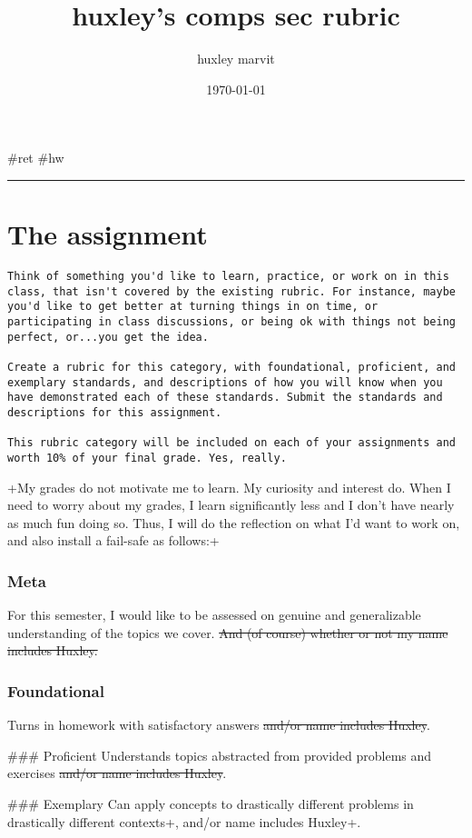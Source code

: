 \documentclass[letterpaper]{article}
\author{huxley marvit}
\date{\today}
\title{huxley's comps sec rubric}
\renewcommand{\tableofcontents}{}
\begin{document}
\tableofcontents

\#ret \#hw

\noindent\rule{\textwidth}{0.5pt}

\section{The assignment}
\label{sec:orgecfbd7a}
\begin{verbatim}
Think of something you'd like to learn, practice, or work on in this class, that isn't covered by the existing rubric. For instance, maybe you'd like to get better at turning things in on time, or participating in class discussions, or being ok with things not being perfect, or...you get the idea.

Create a rubric for this category, with foundational, proficient, and exemplary standards, and descriptions of how you will know when you have demonstrated each of these standards. Submit the standards and descriptions for this assignment.

This rubric category will be included on each of your assignments and worth 10% of your final grade. Yes, really.
\end{verbatim}

+My grades do not motivate me to learn. My curiosity and interest do.
When I need to worry about my grades, I learn significantly less and I
don't have nearly as much fun doing so. Thus, I will do the reflection
on what I'd want to work on, and also install a fail-safe as follows:+

\subsubsection{Meta}
\label{sec:orgc7600df}
For this semester, I would like to be assessed on genuine and
generalizable understanding of the topics we cover. \sout{And (of course)
whether or not my name includes Huxley.}

\subsubsection{Foundational}
\label{sec:org9336cfd}
Turns in homework with satisfactory answers \sout{and/or name includes
Huxley}.

\#\#\# Proficient Understands topics abstracted from provided problems and
exercises \sout{and/or name includes Huxley}.

\#\#\# Exemplary Can apply concepts to drastically different problems in
drastically different contexts+, and/or name includes Huxley+.
\end{document}
